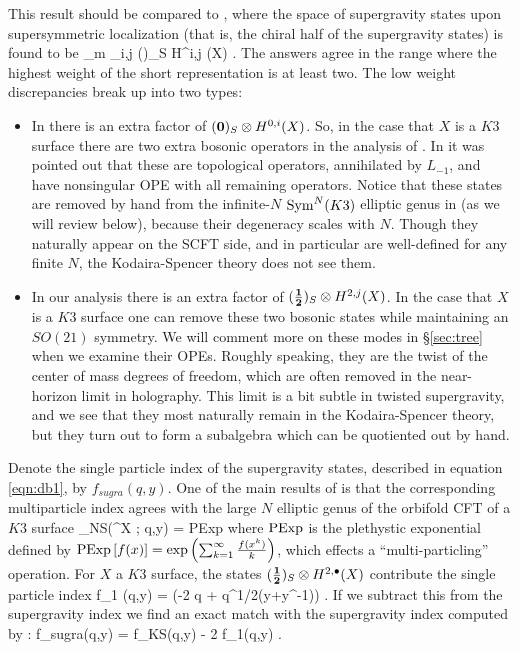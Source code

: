 \documentclass[../main.tex]{subfiles}
\begin{document}
This result should be compared to \cite{deBoerEG}, where the space of supergravity states upon supersymmetric localization (that is, the chiral half of the supergravity states) is found to be
\beqn\label{eqn:db1}
\bigoplus_{m } \bigoplus_{i,j} ()_S \otimes H^{i,j} (X) .
\eeqn
The answers agree in the range where the highest weight of the short representation is at least two. 
The low weight discrepancies break up into two types:
\begin{itemize}
\item In \cite{deBoerEG} there is an extra factor of $({\bf 0})_S \otimes H^{0,i}(X)$. 
So, in the case that $X$ is a $K3$ surface there are two extra bosonic operators in the analysis of \cite{deBoerEG}. 
In \cite{CP} it was pointed out that these are topological operators, annihilated by $L_{-1}$, and have nonsingular OPE with all remaining operators. 
Notice that these states are removed by hand from the infinite-$N$ ${\rm Sym}^N(K3)$ elliptic genus in \cite{deBoerEG} (as we will review below), because their degeneracy scales with $N$. Though they naturally appear on the SCFT side, and in particular are well-defined for any finite $N$, the Kodaira-Spencer theory does not see them. 
\item 
In our analysis there is an extra factor of $(\frac{\bf 1}{\bf 2})_S \otimes H^{2,j}(X)$. 
In the case that $X$ is a $K3$ surface one can remove these two bosonic states while maintaining an $SO(21)$ symmetry. We will comment more on these modes in \S \ref{sec:tree} when we examine their OPEs. Roughly speaking, they are the twist of the center of mass degrees of freedom, which are often removed in the near-horizon limit in holography. This limit is a bit subtle in twisted supergravity, and we see that they most naturally remain in the Kodaira-Spencer theory, but they turn out to form a subalgebra which can be quotiented out by hand. 
\end{itemize}

Denote the single particle index of the supergravity states, described in equation \eqref{eqn:db1}, by $f_{sugra}(q,y)$. 
One of the main results of \cite{deBoerEG} is that the corresponding multiparticle index agrees with the large $N$ elliptic genus of the orbifold CFT of a $K3$ surface
\beqn
\chi_{NS}(\Sym^\infty X ; q,y) = {\rm PExp} 
\eeqn
where ${\rm PExp}$ is the plethystic exponential defined by ${\rm PExp}\left[f(x) \right] = {\rm exp}\left(\sum_{k=1}^{\infty} {f(x^k) \over k}\right)$, which effects a ``multi-particling'' operation.
For $X$ a $K3$ surface, the states $(\mathbf{\frac12})_S \otimes H^{2,{\bullet}}(X)$ contribute the single particle index
 f_1 (q,y) = \left(-2 q + q^{1/2}(y+y^{-1})\right) .
\eeqn
If we subtract this from the supergravity index we find an exact match with the supergravity index computed by \cite{deBoerEG}:
\beqn\label{eqn:sugraindex}
f_{sugra}(q,y) = f_{KS}(q,y) - 2 f_1(q,y) .
\eeqn
\end{document}
